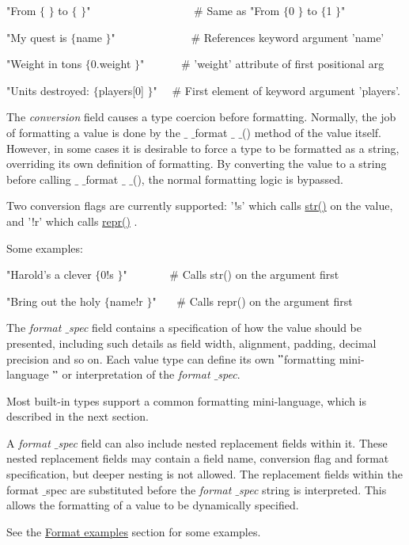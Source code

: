 \documentclass[a4paper,12pt]{report}
\begin{document}
\noindent 
"From  $  \{  $ $  \}  $ to  $  \{  $ $  \}  $"~~~~~~~~~~~~~~~~~~  $  \#  $ Same as "From  $  \{  $0 $  \}  $ to  $  \{  $1 $  \}  $" \par
\noindent 
"My quest is  $  \{  $name $  \}  $"~~~~~~~~~~~~~  $  \#  $ References keyword argument 'name' \par
\noindent 
"Weight in tons  $  \{  $0.weight $  \}  $"~~~~~~  $  \#  $ 'weight' attribute of first positional arg \par
\noindent 
"Units destroyed:  $  \{  $players[0] $  \}  $"~~  $  \#  $ First element of keyword argument 'players'. \par
\noindent 
The \emph{conversion} field causes a type coercion before formatting. Normally, the job of formatting a value is done by the  $  \_  $ $  \_  $format $  \_  $ $  \_  $() method of the value itself. However, in some cases it is desirable to force a type to be formatted as a string, overriding its own definition of formatting. By converting the value to a string before calling  $  \_  $ $  \_  $format $  \_  $ $  \_  $(), the normal formatting logic is bypassed. \par
\noindent 
Two conversion flags are currently supported: '!s' which calls \href{https://docs.python.org/2/library/functions.html}{str()}
 on the value, and '!r' which calls \href{https://docs.python.org/2/library/functions.html}{repr()}
. \par
\noindent 
Some examples: \par
\noindent 
"Harold's a clever  $  \{  $0!s $  \}  $"~~~~~~~  $  \#  $ Calls str() on the argument first \par
\noindent 
"Bring out the holy  $  \{  $name!r $  \}  $"~~~  $  \#  $ Calls repr() on the argument first \par
\noindent 
The \emph{format $  \_  $spec} field contains a specification of how the value should be presented, including such details as field width, alignment, padding, decimal precision and so on. Each value type can define its own  $ " $formatting mini-language $ " $ or interpretation of the \emph{format $  \_  $spec}. \par
\noindent 
Most built-in types support a common formatting mini-language, which is described in the next section. \par
\noindent 
A \emph{format $  \_  $spec} field can also include nested replacement fields within it. These nested replacement fields may contain a field name, conversion flag and format specification, but deeper nesting is not allowed. The replacement fields within the format $  \_  $spec are substituted before the \emph{format $  \_  $spec} string is interpreted. This allows the formatting of a value to be dynamically specified. \par
\noindent 
See the \href{https://docs.python.org/2/library/string.html}{Format examples}
 section for some examples. \par
\noindent 
\end{document}
